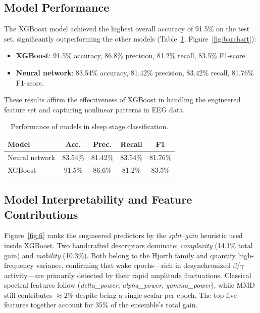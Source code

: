\documentclass[letterpaper]{article} %
\begin{document}
\subsection{Model Performance}
The XGBoost model achieved the highest overall accuracy of 91.5\% on the test set, significantly outperforming the other models (Table~\ref{tab:performance}, Figure~\ref{fig:barchart}):

\begin{itemize}\itemsep2pt\parskip0pt
    \item \textbf{XGBoost}: 91.5\% accuracy, 86.8\% precision, 81.2\% recall, 83.5\% F1-score.
    \item \textbf{Neural network}: 83.54\% accuracy, 81.42\% precision, 83.42\% recall, 81.76\% F1-score.
\end{itemize}

These results affirm the effectiveness of XGBoost in handling the engineered feature set and capturing nonlinear patterns in EEG data.

\begin{table}[t]
\centering
\small
\begin{tabular}{@{}lcccc@{}}
\toprule
\textbf{Model} & \textbf{Acc.} & \textbf{Prec.} & \textbf{Recall} & \textbf{F1} \\
\midrule
Neural network & 83.54\% & 81.42\% & 83.54\% & 81.76\% \\
XGBoost & 91.5\% & 86.6\% & 81.2\% & 83.5\% \\
\bottomrule
\end{tabular}
\caption{Performance of models in sleep stage classification.}
\label{tab:performance}
\end{table}

\subsection{Model Interpretability and Feature Contributions}

Figure~\ref{fig:fi} ranks the engineered predictors by the \emph{split--gain} heuristic used inside XGBoost. Two handcrafted descriptors dominate: \emph{complexity} (14.1\% total gain) and \emph{mobility} (10.3\%). Both belong to the Hjorth family and quantify high-frequency variance, confirming that wake epochs---rich in desynchronized $\beta$/$\gamma$ activity---are primarily detected by their rapid amplitude fluctuations. Classical spectral features follow (\emph{delta\_power}, \emph{alpha\_power}, \emph{gamma\_power}), while MMD still contributes ${\approx}2\%$ despite being a single scalar per epoch. The top five features together account for 35\% of the ensemble's total gain.
\end{document}
